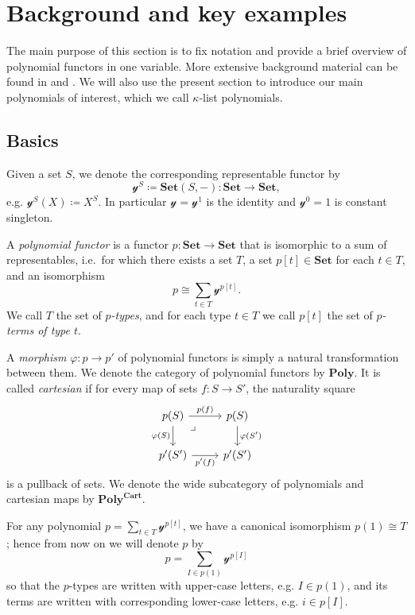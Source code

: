 \documentclass[11pt, one side, article]{memoir}
\theoremstyle{definition}
\theoremstyle{plain}
\newenvironment{definition}
  {\pushQED{\qed}\renewcommand{\qedsymbol}{$\lozenge$}\definitionx}
  {\popQED\enddefinitionx}
\newcommand{\Cat}[1]{\mathbf{#1}}%
\newcommand{\smset}{\Cat{Set}}
\newcommand{\yon}{\mathcal{y}}
\newcommand{\poly}{\Cat{Poly}}
\newcommand{\polycart}{\poly^{\Cat{Cart}}}
\newcommand{\0}{\textsf{0}}
\newcommand{\1}{\tn{\textsf{1}}}
\begin{document}
\chapter{Background and key examples}\label{chap.background}

The main purpose of this section is to fix notation and provide a brief overview of polynomial functors in one variable. More extensive background material can be found in \cite{spivak2022poly} and \cite{kock2012polynomial}. We will also use the present section to introduce our main polynomials of interest, which we call $\kappa$-list polynomials.

\section{Basics}

\begin{definition}[Polynomial functor]\label{def.poly}
Given a set $S$, we denote the corresponding representable functor by
\[\yon^S\coloneqq\smset(S,-)\colon\smset\to\smset,\]
e.g. $\yon^S(X)\coloneqq X^S$. In particular $\yon=\yon^1$ is the identity and $\yon^0=1$ is constant singleton.

A \emph{polynomial functor} is a functor $p\colon\smset\to\smset$ that is isomorphic to a sum of representables, i.e.\ for which there exists a set $T$, a set $p[t]\in\smset$ for each $t\in T$, and an isomorphism
\[
p\cong\sum_{t\in T}\yon^{p[t]}.
\]
We call $T$ the set of \emph{$p$-types}, and for each type $t\in T$ we call $p[t]$ the set of \emph{$p$-terms of type $t$}.%

A \emph{morphism} $\varphi\colon p\to p'$ of polynomial functors is simply a natural transformation between them. We denote the category of polynomial functors by $\poly$. It is called \emph{cartesian} if for every map of sets $f\colon S\to S'$, the naturality square
\[
\begin{tikzcd}
  p(S)\ar[r, "p(f)"]\ar[d, "\varphi(S)"']&p(S)\ar[d, "\varphi(S')"]\\
  p'(S')\ar[r, "p'(f)"']&p'(S')\ar[ul, phantom, very near end, "\lrcorner"]
\end{tikzcd}
\]
is a pullback of sets. We denote the wide subcategory of polynomials and cartesian maps by $\polycart$.
\end{definition}

For any polynomial $p=\sum_{t\in T}\yon^{p[t]}$, we have a canonical isomorphism $p(1)\cong T$; hence from now on we will denote $p$ by
\begin{equation}\label{eqn.poly_notation}
p=\sum_{I\in p(1)}\yon^{p[I]}
\end{equation}
so that the $p$-types are written with upper-case letters, e.g. $I\in p(1)$, and its terms are written with corresponding lower-case letters, e.g. $i\in p[I]$.
\end{document}
